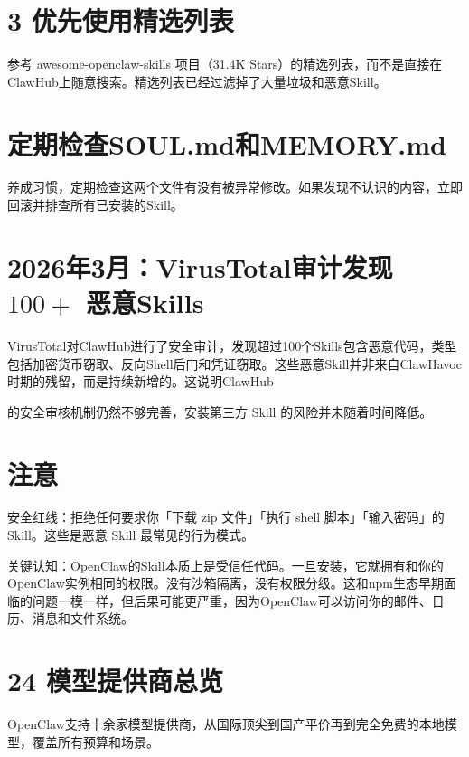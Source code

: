 \documentclass[
  10
]{article}
\begin{document}
\section{3
优先使用精选列表}\label{ux4f18ux5148ux4f7fux7528ux7cbeux9009ux5217ux8868}

参考 awesome-openclaw-skills 项目（31.4K
Stars）的精选列表，而不是直接在ClawHub上随意搜索。精选列表已经过滤掉了大量垃圾和恶意Skill。

\section{定期检查SOUL.md和MEMORY.md}\label{ux5b9aux671fux68c0ux67e5soul.mdux548cmemory.md}

养成习惯，定期检查这两个文件有没有被异常修改。如果发现不认识的内容，立即回滚并排查所有已安装的Skill。

\section{\texorpdfstring{2026年3月：VirusTotal审计发现 \(100 +\)
恶意Skills}{2026年3月：VirusTotal审计发现 100 + 恶意Skills}}\label{ux5e743ux6708virustotalux5ba1ux8ba1ux53d1ux73b0-100-ux6076ux610fskills}

VirusTotal对ClawHub进行了安全审计，发现超过100个Skills包含恶意代码，类型包括加密货币窃取、反向Shell后门和凭证窃取。这些恶意Skill并非来自ClawHavoc时期的残留，而是持续新增的。这说明ClawHub

的安全审核机制仍然不够完善，安装第三方 Skill 的风险并未随着时间降低。

\section{注意}\label{ux6ce8ux610f-13}

安全红线：拒绝任何要求你「下载 zip 文件」「执行 shell
脚本」「输入密码」的 Skill。这些是恶意 Skill 最常见的行为模式。

关键认知：OpenClaw的Skill本质上是受信任代码。一旦安装，它就拥有和你的OpenClaw实例相同的权限。没有沙箱隔离，没有权限分级。这和npm生态早期面临的问题一模一样，但后果可能更严重，因为OpenClaw可以访问你的邮件、日历、消息和文件系统。

\section{24
模型提供商总览}\label{ux6a21ux578bux63d0ux4f9bux5546ux603bux89c8}

OpenClaw支持十余家模型提供商，从国际顶尖到国产平价再到完全免费的本地模型，覆盖所有预算和场景。
\end{document}
